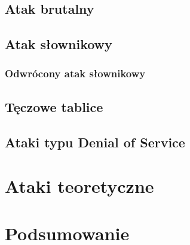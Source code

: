 \documentclass[12pt,a4paper,twoside]{article}
\begin{document}
\subsection{Atak brutalny}

\subsection{Atak słownikowy}

\subsubsection{Odwrócony atak słownikowy}

\subsection{Tęczowe tablice}

\subsection{Ataki typu Denial of Service}

\section{Ataki teoretyczne}

\section{Podsumowanie}
\end{document}
